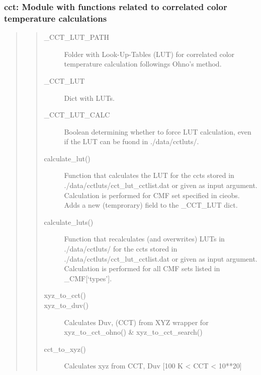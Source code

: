 \documentclass[letterpaper,10pt,english]{sphinxmanual}
\begin{document}
\subsubsection{cct: Module with functions related to correlated color temperature calculations}
\label{\detokenize{color:cct-module-with-functions-related-to-correlated-color-temperature-calculations}}\begin{quote}
\begin{quote}\begin{description}
\item[{\_CCT\_LUT\_PATH}] \leavevmode
Folder with Look-Up-Tables (LUT) for correlated color 
temperature calculation followings Ohno’s method.

\item[{\_CCT\_LUT}] \leavevmode
Dict with LUTs.

\item[{\_CCT\_LUT\_CALC}] \leavevmode
Boolean determining whether to force LUT calculation, even if
the LUT can be fuond in ./data/cctluts/.

\item[{calculate\_lut()}] \leavevmode
Function that calculates the LUT for the ccts stored in 
./data/cctluts/cct\_lut\_cctlist.dat or given as input 
argument. Calculation is performed for CMF set specified in
cieobs. Adds a new (temprorary) field to the \_CCT\_LUT dict.

\item[{calculate\_luts()}] \leavevmode
Function that recalculates (and overwrites) LUTs in 
./data/cctluts/ for the ccts stored in 
./data/cctluts/cct\_lut\_cctlist.dat or given as input 
argument. Calculation is performed for all CMF sets listed 
in \_CMF{[}‘types’{]}.

\item[{xyz\_to\_cct()}] \leavevmode
{}

\item[{xyz\_to\_duv()}] \leavevmode
Calculates Duv, (CCT) from XYZ
wrapper for xyz\_to\_cct\_ohno() \& xyz\_to\_cct\_search()

\item[{cct\_to\_xyz()}] \leavevmode
Calculates xyz from CCT, Duv {[}100 K \textless{} CCT \textless{} 10**20{]}


\end{description}
\end{quote}
\end{quote}
\end{document}
